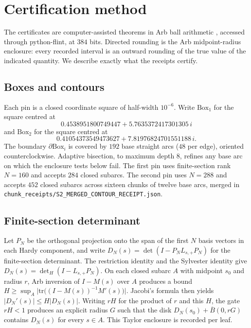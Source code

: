 \documentclass[11pt]{amsart}
\theoremstyle{definition}
\theoremstyle{remark}
\begin{document}
\section{Certification method}
\label{sec:method}

The certificates are computer-assisted theorems in Arb ball arithmetic
\cite{Johansson2017}, accessed through python-flint, at $384$ bits.
Directed rounding is the Arb midpoint-radius enclosure: every
recorded interval is an outward rounding of the true value of the
indicated quantity. We describe exactly what the receipts certify.

\subsection{Boxes and contours}

Each pin is a closed coordinate square of half-width $10^{-6}$. Write
$\mathrm{Box}_1$ for the square centred at
\[
0.4538951800749447+5.7635372417301305\,i
\]
and $\mathrm{Box}_2$ for the square centred at
\[
0.41054373549473627+7.81976824701551188\,i.
\]
The boundary $\partial\mathrm{Box}_i$ is covered by $192$ base
straight arcs ($48$ per edge), oriented counterclockwise. Adaptive
bisection, to maximum depth $8$, refines any base arc on which the
enclosure tests below fail. The first pin uses finite-section rank
$N=160$ and accepts $284$ closed subarcs. The second pin uses
$N=288$ and accepts $452$ closed subarcs across sixteen chunks of
twelve base arcs, merged in
\texttt{chunk\_receipts/}\allowbreak\texttt{S2\_MERGED\_}\allowbreak\texttt{CONTOUR\_RECEIPT.json}.

\subsection{Finite-section determinant}

Let $P_N$ be the orthogonal projection onto the span of the first $N$
basis vectors in each Hardy component, and write
$D_N(s)=\det(I-P_N L_{s,+} P_N)$ for the finite-section determinant.
The restriction identity and the Sylvester identity give
$D_N(s)=\det_H(I-L_{s,+}P_N)$. On each closed subarc $A$ with
midpoint $s_0$ and radius $r$, Arb inversion of $I-M(s)$ over $A$
produces a bound $H\ge \sup_A\bigl|\mathrm{tr}\bigl((I-M(s))^{-1}
M'(s)\bigr)\bigr|$. Jacobi's formula then yields $|D_N'(s)|\le H
|D_N(s)|$. Writing $rH$ for the product of $r$ and this $H$, the
gate $rH<1$ produces an explicit radius $G$ such that the disk
$D_N(s_0)+\overline{B}(0,rG)$ contains $D_N(s)$ for every $s\in A$.
This Taylor enclosure is recorded per leaf.
\end{document}
